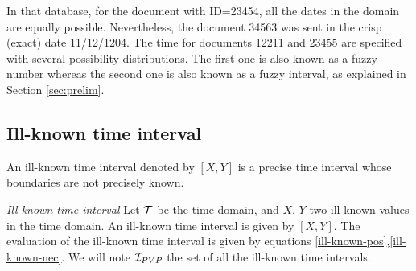 In that database, for the document with ID=23454, all the dates in the domain are equally possible. Nevertheless, the document 34563 was sent in the crisp (exact) date 11/12/1204. The time for documents 12211 and 23455 are specified with several possibility distributions. The first one is also known as a fuzzy number whereas the second one is also known as a fuzzy interval, as explained in Section \ref{sec:prelim}.
 
 
 


\subsection{\label{subsec:ill-known-interval}Ill-known time interval}



An ill-known time interval denoted by $\left[X, Y\right]$ is a precise time interval whose boundaries are not precisely known. %

\begin{definition}
\emph{Ill-known time interval}
Let $\mathcal{T}$ be the time domain, and $X$, $Y$ two ill-known values in the time domain. An ill-known time interval is given by $\left[X, Y\right]$. The evaluation of the ill-known time interval is given by equations \eqref{ill-known-pos},\eqref{ill-known-nec}. We will note $\mathcal{I}_{PVP}$ the set of all the ill-known time intervals.

\end{definition}


